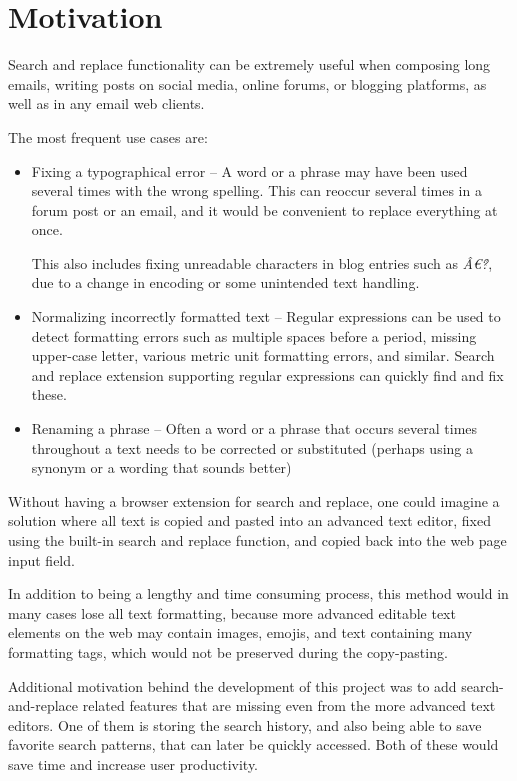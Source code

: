 \documentclass[bsc,frontabs,twoside,singlespacing,parskip,deptreport]{infthesis}
\begin{document}
\section{Motivation}
Search and replace functionality can be extremely useful when composing long emails, writing posts on social media, online forums, or blogging platforms, as well as in any email web clients. 

The most frequent use cases are:
\begin{itemize}
\item Fixing a typographical error -- A word or a phrase may have been used several times with the wrong spelling. This can reoccur several times in a forum post or an email, and it would be convenient to replace everything at once.

This also includes fixing unreadable characters in blog entries such as {\it \^{A}\euro\r{?}}, due to a change in encoding or some unintended text handling.

\item Normalizing incorrectly formatted text -- Regular expressions can be used to detect formatting errors such as multiple spaces before a period, missing upper-case letter, various metric unit formatting errors, and similar. Search and replace extension supporting regular expressions can quickly find and fix these.

\item Renaming a phrase -- Often a word or a phrase that occurs several times throughout a text needs to be corrected or substituted (perhaps using a synonym or a wording that sounds better)
\end{itemize}

Without having a browser extension for search and replace, one could imagine a solution where all text is copied and pasted into an advanced text editor, fixed using the built-in search and replace function, and copied back into the web page input field.

In addition to being a lengthy and time consuming process, this method would in many cases lose all text formatting, because more advanced editable text elements on the web may contain images, emojis, and text containing many formatting tags, which would not be preserved during the copy-pasting.

Additional motivation behind the development of this project was to add search-and-replace related features that are missing even from the more advanced text editors. One of them is storing the search history, and also being able to save favorite search patterns, that can later be quickly accessed. Both of these would save time and increase user productivity.
\end{document}
